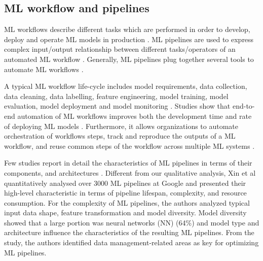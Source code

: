 \subsection{ML workflow and pipelines}

ML workflows describe different tasks which are performed in order to develop, deploy and operate ML models in production \cite{Amershi2019}. ML pipelines are used to express complex input/output relationship between 
different tasks/operators of an automated ML workflow \cite{Doris2021MLPipelines}. Generally, ML pipelines plug together several tools to automate ML workflows \cite{Hummer2019IBM}.

A typical ML workflow life-cycle includes model requirements, data collection, data cleaning, data labelling, feature engineering, model training, model evaluation, model deployment and model monitoring \cite{Amershi2019}. Studies show that end-to-end automation of ML workflows improves both the development time and rate of deploying ML models \cite{Hummer2019IBM,Doris2021MLPipelines}. Furthermore, it allows organizations to automate orchestration of workflows steps, track and reproduce the outputs of a ML workflow, and reuse common steps of the workflow across multiple ML systems \cite{Baylor2017, Hummer2019IBM}. %

Few studies report in detail the characteristics of ML pipelines in terms of their components, and architectures \cite{Hummer2019IBM,Doris2021MLPipelines}. Different from our qualitative analysis, Xin et al \cite{Doris2021MLPipelines} quantitatively analysed over 3000 ML pipelines at Google and presented their high-level characteristic in terms of pipeline lifespan, complexity, and resource consumption. For the complexity of ML pipelines, the authors analyzed typical input data shape, feature transformation and model diversity. Model diversity showed that a large portion was neural networks (NN) (64\%) and model type and architecture influence the characteristics of the resulting ML pipelines. %
From the study, the authors \cite{Doris2021MLPipelines} identified data management-related areas as key for optimizing ML pipelines. %

